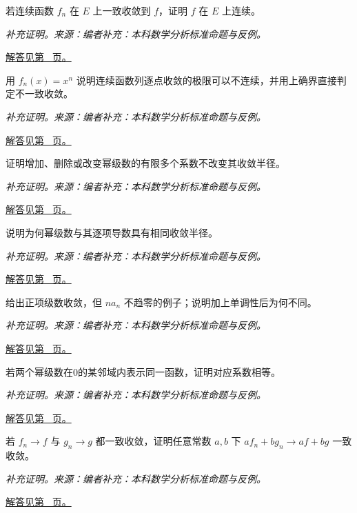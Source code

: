 \documentclass[12pt,fontset=fandol]{ctexart}
\begin{document}
\begin{example}[一致极限保持连续性]\label{ex:c29q13}
若连续函数 $f_n$ 在 $E$ 上一致收敛到 $f$，证明 $f$ 在 $E$ 上连续。
\par\textit{补充证明。来源：编者补充：本科数学分析标准命题与反例。}\par\hyperref[ans:c29q13]{解答见第~\pageref{ans:c29q13} 页。}
\end{example}
\begin{example}[逐点收敛的极限可以不连续]\label{ex:c29q14}
用 $f_n(x)=x^n$ 说明连续函数列逐点收敛的极限可以不连续，并用上确界直接判定不一致收敛。
\par\textit{补充证明。来源：编者补充：本科数学分析标准命题与反例。}\par\hyperref[ans:c29q14]{解答见第~\pageref{ans:c29q14} 页。}
\end{example}
\begin{example}[幂级数半径不受有限项影响]\label{ex:c29q15}
证明增加、删除或改变幂级数的有限多个系数不改变其收敛半径。
\par\textit{补充证明。来源：编者补充：本科数学分析标准命题与反例。}\par\hyperref[ans:c29q15]{解答见第~\pageref{ans:c29q15} 页。}
\end{example}
\begin{example}[逐项求导后的半径]\label{ex:c29q16}
说明为何幂级数与其逐项导数具有相同收敛半径。
\par\textit{补充证明。来源：编者补充：本科数学分析标准命题与反例。}\par\hyperref[ans:c29q16]{解答见第~\pageref{ans:c29q16} 页。}
\end{example}
\begin{example}[正项级数与下标加权的通项]\label{ex:c29q17}
给出正项级数收敛，但 $na_n$ 不趋零的例子；说明加上单调性后为何不同。
\par\textit{补充证明。来源：编者补充：本科数学分析标准命题与反例。}\par\hyperref[ans:c29q17]{解答见第~\pageref{ans:c29q17} 页。}
\end{example}
\begin{example}[从幂级数唯一性比较系数]\label{ex:c29q18}
若两个幂级数在0的某邻域内表示同一函数，证明对应系数相等。
\par\textit{补充证明。来源：编者补充：本科数学分析标准命题与反例。}\par\hyperref[ans:c29q18]{解答见第~\pageref{ans:c29q18} 页。}
\end{example}
\begin{example}[一致收敛的线性组合]\label{ex:c29q19}
若 $f_n\to f$ 与 $g_n\to g$ 都一致收敛，证明任意常数 $a,b$ 下 $af_n+bg_n\to af+bg$ 一致收敛。
\par\textit{补充证明。来源：编者补充：本科数学分析标准命题与反例。}\par\hyperref[ans:c29q19]{解答见第~\pageref{ans:c29q19} 页。}
\end{example}
\end{document}
